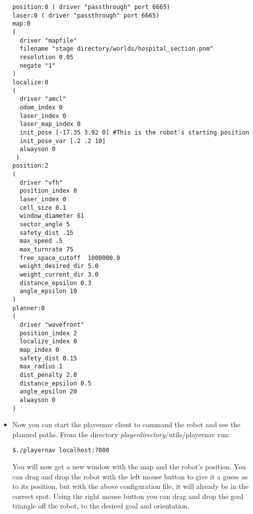 \begin{itemize}
\begin{verbatim}
position:0 ( driver "passthrough" port 6665)
laser:0 ( driver "passthrough" port 6665)
map:0 
(
  driver "mapfile" 
  filename "stage directory/worlds/hospital_section.pnm" 
  resolution 0.05 
  negate "1"
)
localize:0
(
  driver "amcl"
  odom_index 0
  laser_index 0
  laser_map_index 0
  init_pose [-17.35 3.92 0] #This is the robot's starting position
  init_pose_var [.2 .2 10]
  alwayson 0
 )
position:2
(
  driver "vfh"
  position_index 0
  laser_index 0
  cell_size 0.1
  window_diameter 61
  sector_angle 5
  safety_dist .15
  max_speed .5
  max_turnrate 75
  free_space_cutoff  1000000.0
  weight_desired_dir 5.0
  weight_current_dir 3.0
  distance_epsilon 0.3
  angle_epsilon 10
)
planner:0
(
  driver "wavefront"
  position_index 2
  localize_index 0
  map_index 0
  safety_dist 0.15
  max_radius 1
  dist_penalty 2.0
  distance_epsilon 0.5
  angle_epsilon 20
  alwayson 0
)
\end{verbatim}

\item Now you can start the playernav client to command the robot and see the planned paths. From the directory {\em playerdirectory}/utils/playernav run:

\begin{verbatim}
$./playernav localhost:7000
\end{verbatim}

You will now get a new window with the map and the robot's position. You can drag and drop the robot with the left mouse button to 
give it a guess as to its position, but with the above configuration file, it will already be in the correct spot. Using the right mouse button
you can drag and drop the goal triangle off the robot, to the desired goal and orientation.

\end{itemize}




